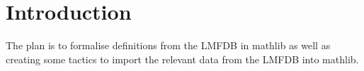 %

\tableofcontents

\chapter{Introduction}

The plan is to formalise definitions from the LMFDB in mathlib as well as creating some tactics to import the
relevant data from the LMFDB into mathlib.





